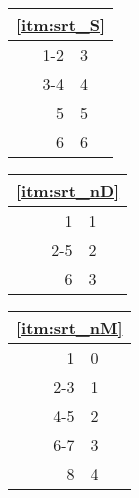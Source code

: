 
\begin{tabular}{| r | l |}
\hline
\multicolumn{2}{|c|}{\ref{itm:srt_S}} \\
\hline
1-2 & 3 \\
3-4 & 4 \\
5 & 5 \\
6 & 6 \\
\hline
\end{tabular}

\begin{tabular}{| r | l |}
\hline
\multicolumn{2}{|c|}{\ref{itm:srt_nD}} \\
\hline
1 & 1 \\
2-5 & 2 \\
6 & 3 \\
\hline
\end{tabular}

\begin{tabular}{| r | l |}
\hline
\multicolumn{2}{|c|}{\ref{itm:srt_nM}} \\
\hline
1 & 0 \\
2-3 & 1 \\
4-5 & 2 \\
6-7 & 3 \\
8 & 4 \\
\hline
\end{tabular}
